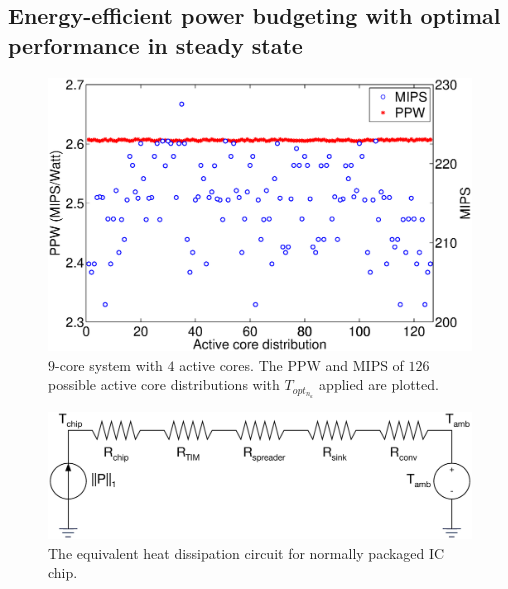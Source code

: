 


\subsection{Energy-efficient power budgeting with optimal performance
  in steady state}

\begin{figure}
  \centering
  \includegraphics[width=0.9\columnwidth]{fig/mips_ppw.eps}
  \caption{$9$-core system with $4$ active cores. The PPW and MIPS of $126$ possible active core distributions with $T_{opt_{n_{a}}}$ applied are plotted.}
  \label{fig:mips_ppw}
\end{figure}
\begin{figure}
  \centering
  \includegraphics[width=0.8\columnwidth]{fig/resistor_line.eps}
  \caption{The equivalent heat dissipation circuit for normally
    packaged IC chip.}
  \label{fig:resistor_line}
\end{figure}

